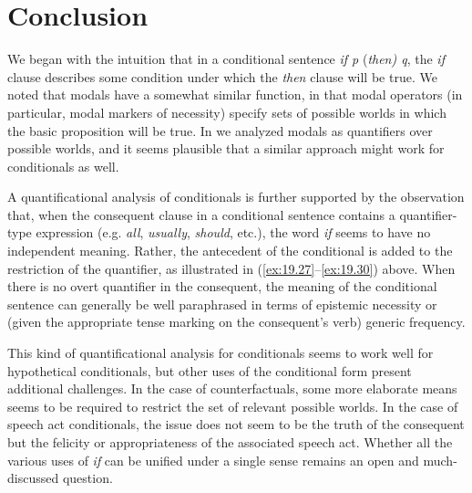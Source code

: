 \section{Conclusion}\label{sec:19.8}

We began with the intuition that in a conditional sentence \textit{if p} (\textit{then) q}, the \textit{if} clause describes some condition under which the \textit{then} clause will be true. We noted that modals have a somewhat similar function, in that modal operators (in particular, modal markers of necessity) specify sets of possible worlds in which the basic proposition will be true. In  we analyzed modals as quantifiers over possible worlds, and it seems plausible that a similar approach might work for conditionals as well.



A quantificational analysis of conditionals is further supported by the observation that, when the consequent clause in a conditional sentence contains a quantifier-type expression (e.g. \textit{all}, \textit{usually}, \textit{should}, etc.), the word \textit{if} seems to have no independent meaning. Rather, the antecedent of the conditional is added to the restriction of the quantifier, as illustrated in (\ref{ex:19.27}--\ref{ex:19.30}) above. When there is no overt quantifier in the consequent, the meaning of the conditional sentence can generally be well paraphrased in terms of epistemic necessity or (given the appropriate tense marking on the consequent’s verb) generic frequency.



This kind of quantificational analysis for conditionals seems to work well for hypothetical conditionals, but other uses of the conditional form present additional challenges. In the case of counterfactuals, some more elaborate means seems to be required to restrict the set of relevant possible worlds. In the case of speech act conditionals, the issue does not seem to be the truth of the consequent but the felicity or appropriateness of the associated speech act. Whether all the various uses of \textit{if} can be unified under a single sense remains an open and much-discussed question.



\furtherreading



